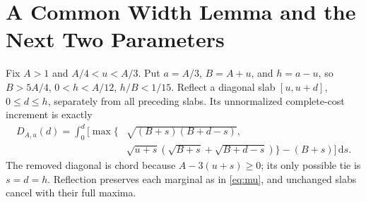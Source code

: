 \documentclass[11pt,letterpaper]{article}
\newcommand{\dd}{\,\mathrm d}
\begin{document}
\section{A Common Width Lemma and the Next Two Parameters}\label{sec:widths}
Fix $A>1$ and $A/4<u<A/3$. Put $a=A/3$, $B=A+u$, and $h=a-u$,
so $B>5A/4$, $0<h<A/12$, $h/B<1/15$. Reflect a diagonal slab
$[u,u+d]$, $0\le d\le h$, separately from all preceding slabs. Its
unnormalized complete-cost increment is exactly
\begin{equation}\label{eq:widthcost}
\begin{split}
 D_{A,u}(d)=\int_0^d\bigl[\max\{&\sqrt{(B+s)(B+d-s)},\\
 &\sqrt{u+s}(\sqrt{B+s}+\sqrt{B+d-s})\}-(B+s)\bigr]\dd s.
\end{split}
\end{equation}
The removed diagonal is chord because $A-3(u+s)\ge0$; its only possible
tie is $s=d=h$. Reflection preserves each marginal as in
\eqref{eq:mu}, and unchanged slabs cancel with their full maxima.
\end{document}
